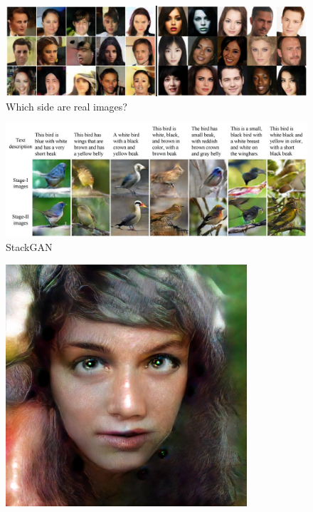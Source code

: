 \documentclass{beamer}
\begin{document}
\begin{frame}
\begin{figure}[h!]
	\centering
	\includegraphics[width=\textwidth]{which_is_real.png}
	\caption{Which side are real images?}
	\label{fig:which_is_real}
\end{figure}
\end{frame}


\begin{frame}
\begin{figure}[h!]
	\centering
	\includegraphics[width=\textwidth]{stack_gan.jpg}
	\caption{StackGAN}
\end{figure}
\end{frame}

\begin{frame}
\begin{figure}[h!]
	\centering
	\includegraphics[width=0.8\textwidth]{4k_woman.jpg}
\end{figure}
\end{frame}
\end{document}

